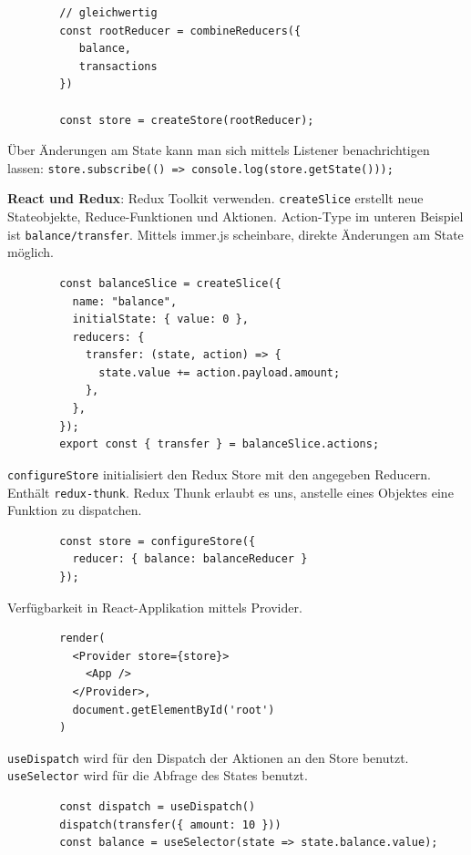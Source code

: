 \documentclass[10pt,landscape]{article}
\begin{document}
\begin{multicols}{2}
\begin{lstlisting}
        // gleichwertig
        const rootReducer = combineReducers({
           balance,
           transactions
        })

        const store = createStore(rootReducer);
        \end{lstlisting}

        Über Änderungen am State kann man sich mittels Listener benachrichtigen lassen: \lstinline{store.subscribe(() => console.log(store.getState()));}

        \textbf{React und Redux}: Redux Toolkit verwenden.
        \lstinline{createSlice} erstellt neue Stateobjekte, Reduce-Funktionen und Aktionen.
        Action-Type im unteren Beispiel ist \lstinline{balance/transfer}.
        Mittels immer.js scheinbare, direkte Änderungen am State möglich.

        \begin{lstlisting}
        const balanceSlice = createSlice({
          name: "balance",
          initialState: { value: 0 },
          reducers: {
            transfer: (state, action) => {
              state.value += action.payload.amount;
            },
          },
        });
        export const { transfer } = balanceSlice.actions;
        \end{lstlisting}

        \lstinline{configureStore} initialisiert den Redux Store mit den angegeben Reducern.
        Enthält \lstinline{redux-thunk}.
        Redux Thunk erlaubt es uns, anstelle eines Objektes eine Funktion zu dispatchen.

        \begin{lstlisting}
        const store = configureStore({
          reducer: { balance: balanceReducer }
        });
        \end{lstlisting}

        Verfügbarkeit in React-Applikation mittels Provider.

        \begin{lstlisting}
        render(
          <Provider store={store}>
            <App />
          </Provider>,
          document.getElementById('root')
        )
        \end{lstlisting}

        \lstinline{useDispatch} wird für den Dispatch der Aktionen an den Store benutzt.
        \lstinline{useSelector} wird für die Abfrage des States benutzt.

        \begin{lstlisting}
        const dispatch = useDispatch()
        dispatch(transfer({ amount: 10 }))
        const balance = useSelector(state => state.balance.value);
        \end{lstlisting}


\end{multicols}
\end{document}
